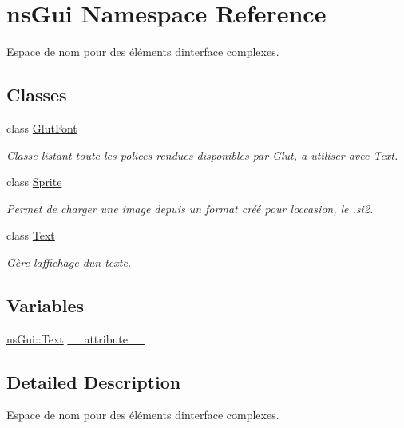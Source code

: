 \hypertarget{namespacens_gui}{}\section{ns\+Gui Namespace Reference}
\label{namespacens_gui}


Espace de nom pour des éléments d\textquotesingle{}interface complexes.  


\subsection*{Classes}
\begin{DoxyCompactItemize}
\item 
class \hyperlink{classns_gui_1_1_glut_font}{Glut\+Font}
\begin{DoxyCompactList}\small\item\em Classe listant toute les polices rendues disponibles par Glut, a utiliser avec \hyperlink{classns_gui_1_1_text}{Text}. \end{DoxyCompactList}\item 
class \hyperlink{classns_gui_1_1_sprite}{Sprite}
\begin{DoxyCompactList}\small\item\em Permet de charger une image depuis un format créé pour l\textquotesingle{}occasion, le .si2. \end{DoxyCompactList}\item 
class \hyperlink{classns_gui_1_1_text}{Text}
\begin{DoxyCompactList}\small\item\em Gère l\textquotesingle{}affichage d\textquotesingle{}un texte. \end{DoxyCompactList}\end{DoxyCompactItemize}
\subsection*{Variables}
\begin{DoxyCompactItemize}
\item 
\hyperlink{classns_gui_1_1_text}{ns\+Gui\+::\+Text} \hyperlink{namespacens_gui_a0b510e57a385a14630418d22a10b38c9}{\+\_\+\+\_\+attribute\+\_\+\+\_\+}
\end{DoxyCompactItemize}


\subsection{Detailed Description}
Espace de nom pour des éléments d\textquotesingle{}interface complexes. 

